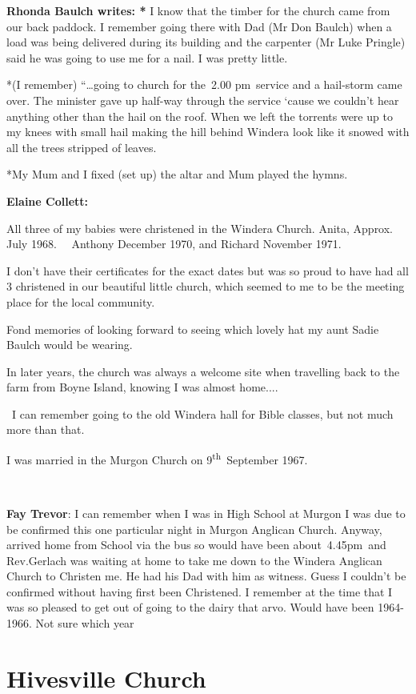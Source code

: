 \textbf{Rhonda Baulch writes: *} I know that the timber for the church came from our back paddock. I remember going there with Dad (Mr Don Baulch) when a load was being delivered during its building and the carpenter (Mr Luke Pringle) said he was going to use me for a nail. I was pretty little.

*(I remember) ``\ldots going to church for the~2.00 pm~service and a hail-storm came over. The minister gave up half-way through the service `cause we couldn't hear anything other than the hail on the roof. When we left the torrents were up to my knees with small hail making the hill behind Windera look like it snowed with all the trees stripped of leaves.

*My Mum and I fixed (set up) the altar and Mum played the hymns.

\textbf{Elaine Collett:}

All three of my babies were christened in the Windera Church. Anita, Approx. July 1968.~~ Anthony December 1970, and Richard November 1971.

I don't have their certificates for the exact dates but was so proud to have had all 3 christened in our beautiful little church, which seemed to me to be the meeting place for the local community.

Fond memories of looking forward to seeing which lovely hat my aunt Sadie Baulch would be wearing.

In later years, the church was always a welcome site when travelling back to the farm from Boyne Island, knowing I was almost home....

~I can remember going to the old Windera hall for Bible classes, but not much more than that.

I was married in the Murgon Church on 9\textsuperscript{th}~September 1967.

~

\textbf{Fay Trevor}: I can remember when I was in High School at Murgon I was due to be confirmed this one particular night in Murgon Anglican Church. Anyway, arrived home from School via the bus so would have been about~4.45pm~and Rev.Gerlach was waiting at home to take me down to the Windera Anglican Church to Christen me. He had his Dad with him as witness. Guess I couldn't be confirmed without having first been Christened. I remember at the time that I was so pleased to get out of going to the dairy that arvo. Would have been 1964-1966. Not sure which year

\hypertarget{hivesville-church-1}{%
\section{Hivesville Church}\label{hivesville-church-1}}

